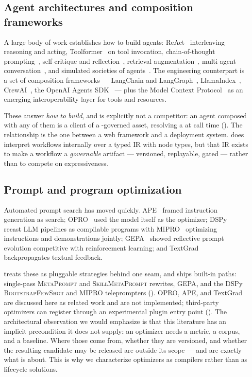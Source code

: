 \subsection{Agent architectures and composition frameworks}

A large body of work establishes how to build agents:
ReAct~\cite{yao2023react} interleaving reasoning and acting,
Toolformer~\cite{schick2023toolformer} on tool invocation,
chain-of-thought prompting~\cite{wei2022cot},
self-critique and reflection~\cite{madaan2023selfrefine,shinn2023reflexion},
retrieval augmentation~\cite{lewis2020rag}, multi-agent
conversation~\cite{wu2024autogen}, and simulated societies of
agents~\cite{park2023generative}. The engineering counterpart is a set of
composition frameworks --- LangChain and LangGraph~\cite{langchain},
LlamaIndex~\cite{llamaindex}, CrewAI~\cite{crewai}, the OpenAI Agents
SDK~\cite{agentssdk} --- plus the Model Context Protocol~\cite{mcp2024} as an
emerging interoperability layer for tools and resources.

These answer \emph{how to build}, and \sys is explicitly not a competitor: an
agent composed with any of them is a client of a \sys-governed asset, resolving a
\livetarget{} at call time (). The relationship is the one
between a web framework and a deployment system. \sys does interpret workflows
internally over a typed IR with \statNodeTypes{} node types, but that IR exists to
make a workflow a \emph{governable} artifact --- versioned, replayable, gated ---
rather than to compete on expressiveness.

\subsection{Prompt and program optimization}

Automated prompt search has moved quickly. APE~\cite{zhou2023ape} framed
instruction generation as search; OPRO~\cite{yang2024opro} used the model itself as
the optimizer; DSPy~\cite{khattab2024dspy} recast LLM pipelines as compilable
programs with MIPRO~\cite{opsahlong2024mipro} optimizing instructions and
demonstrations jointly; GEPA~\cite{agrawal2025gepa} showed reflective prompt
evolution competitive with reinforcement learning; and
TextGrad~\cite{yuksekgonul2024textgrad} backpropagates textual feedback.

\sys treats these as pluggable strategies behind one seam, and ships
\statOptimizersW{} built-in paths: single-pass \textsc{MetaPrompt} and
\textsc{SkillMetaPrompt} rewrites, GEPA, and the DSPy \textsc{BootstrapFewShot}
and \textsc{MIPRO} teleprompters (). OPRO, APE, and TextGrad
are discussed here as related work and are not implemented; third-party
optimizers can register through an experimental plugin entry point
(). The architectural
observation we would emphasize is that this literature has an implicit
precondition it does not supply: an optimizer needs a metric, a corpus, and a
baseline. Where those come from, whether they are versioned, and whether the
resulting candidate may be released are outside its scope --- and are exactly what
 is about. This is why we characterize optimizers as
compilers rather than as lifecycle solutions.

